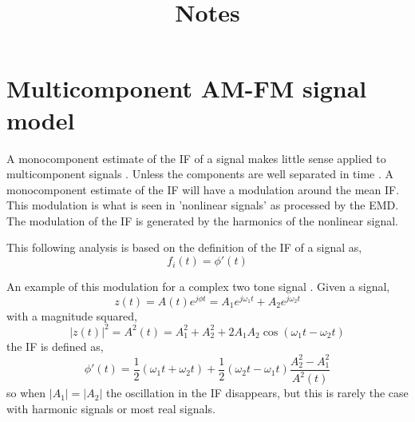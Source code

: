 \documentclass[10pt]{report} %
\title{Notes}
\begin{document}
\maketitle

\section{Multicomponent AM-FM signal model}

A monocomponent estimate of the IF of a signal makes little sense applied to multicomponent signals \cite{}. Unless the components are well separated in time \cite{}. A monocomponent estimate of the IF will have a modulation around the mean IF. This modulation is what is seen in 'nonlinear signals' as processed by the EMD. The modulation of the IF is generated by the harmonics of the nonlinear signal.

This following analysis is based on the definition of the IF of a signal as,
\begin{equation}
f_i(t) = \phi'(t)
\end{equation}

An example of this modulation for a complex two tone signal \cite{}. Given a signal,
\begin{equation}
z(t) = A(t)e^{j\phi t} = A_1e^{j\omega_1 t} + A_2e^{j\omega_2 t}
\end{equation}
with a magnitude squared,
\begin{equation}
|z(t)|^2 = A^2(t) = A_1^2 + A^2_2 + 2A_1A_2 \cos(\omega_1 t - \omega_2 t)
\end{equation}
the IF is defined as, 
\begin{equation}
\phi'(t) =\frac{1}{2}(\omega_1 t + \omega_2 t) + \frac{1}{2}(\omega_2 t - \omega_1 t) \frac{A_2^2 - A_1^2}{A^2(t)}
\end{equation}
so when $|A_1| = |A_2|$ the oscillation in the IF disappears, but this is rarely the case with harmonic signals or most real signals.
\end{document}
